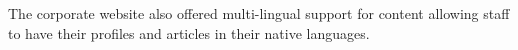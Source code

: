 \documentclass[11pt,a4paper,sans]{moderncv}        %
\begin{document}
    The corporate website also offered multi-lingual support for content allowing staff to have their profiles and articles in their native languages.









\end{document}
